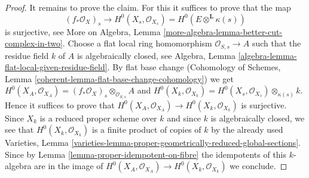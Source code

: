 \begin{proof}
\medskip\noindent
It remains to prove the claim. For this it suffices to prove that the map
$$
(f_*\mathcal{O}_X)_s
\longrightarrow
H^0(X_s, \mathcal{O}_{X_s}) = H^0(E \otimes^\mathbf{L} \kappa(s))
$$
is surjective, see
More on Algebra, Lemma \ref{more-algebra-lemma-better-cut-complex-in-two}.
Choose a flat local ring homomorphism $\mathcal{O}_{S, s} \to A$
such that the residue field $k$ of $A$ is algebraically closed, see
Algebra, Lemma \ref{algebra-lemma-flat-local-given-residue-field}.
By flat base change (Cohomology of Schemes, Lemma
\ref{coherent-lemma-flat-base-change-cohomology})
we get $H^0(X_A, \mathcal{O}_{X_A}) =
(f_*\mathcal{O}_X)_s \otimes_{\mathcal{O}_{S, s}} A$
and $H^0(X_k, \mathcal{O}_{X_k}) =
H^0(X_s, \mathcal{O}_{X_s}) \otimes_{\kappa(s)} k$.
Hence it suffices to prove that
$H^0(X_A, \mathcal{O}_{X_A}) \to H^0(X_k, \mathcal{O}_{X_k})$
is surjective. Since $X_k$ is a reduced proper scheme over $k$
and since $k$ is algebraically closed, we see that
$H^0(X_k, \mathcal{O}_{X_k})$ is a finite product of copies
of $k$ by the already used Varieties, Lemma
\ref{varieties-lemma-proper-geometrically-reduced-global-sections}.
Since by Lemma \ref{lemma-proper-idempotent-on-fibre}
the idempotents of this $k$-algebra are in the image
of $H^0(X_A, \mathcal{O}_{X_A}) \to H^0(X_k, \mathcal{O}_{X_k})$ we conclude.
\end{proof}